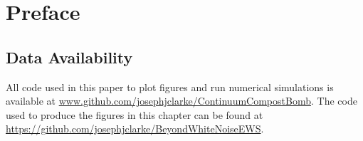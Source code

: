 \chapter{Preface}

\section*{Data Availability}
All code used in this paper to plot figures and run numerical simulations is available at \url{www.github.com/josephjclarke/ContinuumCompostBomb}.
The code used to produce the figures in this chapter can be found at \url{https://github.com/josephjclarke/BeyondWhiteNoiseEWS}.


